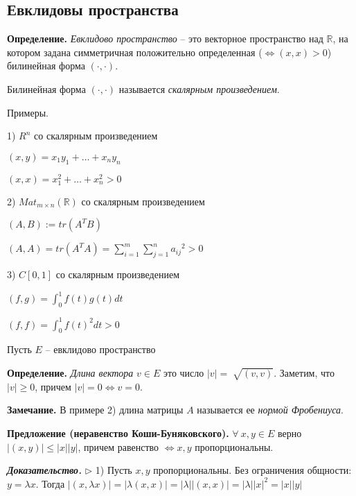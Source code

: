 \vspace{\baselineskip}
\subsection{Евклидовы пространства}

\textbf{Определение.} \textit{Евклидово пространство} -- это векторное пространство над $\mathbb{R}$, на котором задана симметричная положительно определенная ($\Leftrightarrow (x, x) > 0$) билинейная форма $(\cdot, \cdot)$.

Билинейная форма $( \cdot, \cdot)$ называется \textit{скалярным произведением}.

\vspace{\baselineskip}
Примеры.

1) $R^n$ со скалярным произведением

$(x, y) = x_1 y_1 + \dots + x_n y_n$

$(x, x) = x_1^2 + \dots + x_n^2 > 0$

2) $Mat_{m \times n} (\mathbb{R})$ со скалярным произведением

$(A, B) := tr (A^T B)$

$(A, A) = tr (A^T A) = \sum\limits_{i = 1}^m \sum\limits_{j = 1}^n {a_{ij}}^2 > 0$

3) $C[0, 1]$ со скалярным произведением 

$(f, g) = \int_0^1 f(t) g(t) dt$

$(f, f) = \int_0^1 {f(t)^2} dt > 0$

\vspace{\baselineskip}
Пусть $E$ -- евклидово пространство

\vspace{\baselineskip}
\textbf{Определение.} \textit{Длина вектора} $v \in E$ это число $|v| = \sqrt[]{(v, v)}$. Заметим, что $|v| \geq 0$, причем $|v| = 0 \Leftrightarrow v = 0$.

\vspace{\baselineskip}
\textbf{Замечание.} В примере 2) длина матрицы $A$ называется ее \textit{нормой Фробениуса}.

\vspace{\baselineskip}
\textbf{Предложение (неравенство Коши-Буняковского).} $\forall \ x, y \in E$ верно $|(x, y)| \leq |x| |y|$, причем равенство $\Leftrightarrow x, y$ пропорциональны.

\vspace{\baselineskip}
\textbf{\textit{Доказательство.}} $\rhd$ 1) Пусть $x, y$ пропорциональны. Без ограничения общности: $y = \lambda x$. Тогда $|(x, \lambda x)| = |\lambda(x, x)| = |\lambda||(x, x)| = |\lambda||x|^2 = |x||y|$

